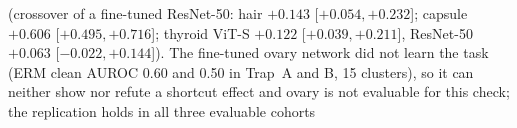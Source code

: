 (crossover of a fine-tuned ResNet-50: hair $+0.143$ [$+0.054, +0.232$]; capsule $+0.606$ [$+0.495, +0.716$]; thyroid ViT-S $+0.122$ [$+0.039, +0.211$], ResNet-50 $+0.063$ [$-0.022, +0.144$]). The fine-tuned ovary network did not learn the task (ERM clean AUROC 0.60 and 0.50 in Trap~A and B, 15 clusters), so it can neither show nor refute a shortcut effect and ovary is not evaluable for this check; the replication holds in all three evaluable cohorts%
